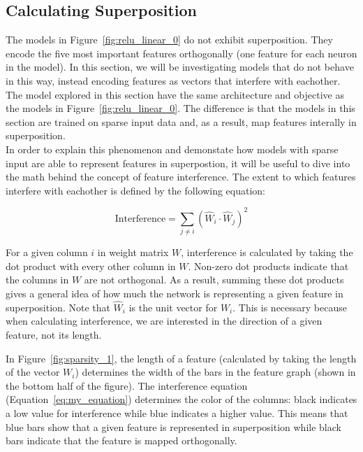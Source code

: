 \documentclass{article} %
\begin{document}
\subsection{Calculating Superposition}
\label{sec:calc_super}

The models in Figure~\ref{fig:relu_linear_0} do not exhibit superposition. They
encode the five most important features orthogonally (one feature for each
neuron in the model). In this section, we will be investigating models
that do not behave in this way, instead encoding features as vectors that interfere
with eachother. The model explored in this section have the same architecture
and objective as the models in Figure~\ref{fig:relu_linear_0}. The difference
is that the models in this section are trained on sparse input data and, as a
result, map features interally in superposition. \\

In order to explain this phenomenon and demonstate how models with sparse input
are able to represent features in superpostion, it will be useful to dive into 
the math behind the concept of feature interference. The extent to which 
features interfere with eachother is defined by the following equation:

\begin{equation}
\label{eq:my_equation}
\text{Interference} = \sum_{j \neq i} (\hat{W}_i \cdot \hat{W}_j)^2
\end{equation}

For a given column $i$ in weight matrix $W$, interference is calculated by taking
the dot product with every other column in $W$. Non-zero dot products indicate
that the columns in $W$ are not orthogonal. As a result, summing these dot 
products gives a general idea of how much the network is representing a given
feature in superposition. Note that $\hat{W}_i$ is the unit vector for $W_i$. 
This is necessary because when calculating interference, we are interested in
the direction of a given feature, not its length.\newline

In Figure~\ref{fig:sparsity_1}, the length of a feature (calculated by taking the
length of the vector $W_i$) determines the width of the bars in the feature
graph (shown in the bottom half of the figure). The interference equation (Equation~\ref{eq:my_equation}) determines the
color of the columns: black indicates a low value for interference
while blue indicates a higher value. This means that blue bars show that a given feature is represented
in superposition while black bars indicate that the feature is mapped orthogonally.
    
\end{document}
